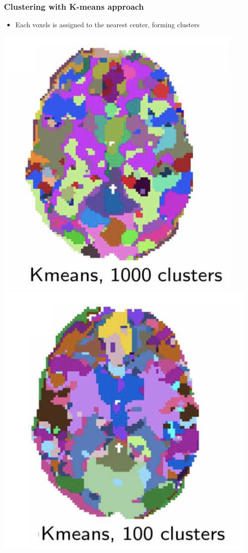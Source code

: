 \documentclass{beamer}
\begin{document}
\begin{frame}
\frametitle{Clustering with K-means approach}
\begin{itemize}
\item Each voxels is assigned to the nearest center, forming clusters
\end{itemize}
\centering
\includegraphics[scale=0.5]{K-means1.png}
\includegraphics[scale=0.5]{K-means2.png}
\end{frame}
\end{document}
